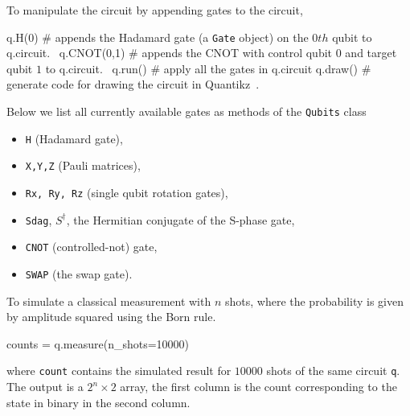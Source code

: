 To manipulate the circuit by appending gates to the circuit,
\begin{mycode}
	q.H(0) # appends the Hadamard gate (a \texttt{Gate} object) on the $ 0th $ qubit to q.circuit. \
	q.CNOT(0,1) # appends the CNOT with control qubit $ 0 $  and target qubit $ 1 $ to q.circuit. \
	q.run() # apply all the gates in q.circuit
	q.draw() # generate code for drawing the circuit in Quantikz~\cite{kay2023tutorialquantikzpackage}.
\end{mycode}
Below we list all currently available gates as methods of the \texttt{Qubits} class
\begin{itemize}
	\item \texttt{H} (Hadamard gate), 
	\item \texttt{X,Y,Z} (Pauli matrices),
	\item \texttt{Rx, Ry, Rz} (single qubit rotation gates),
	\item \texttt{Sdag}, $ S^{\dagger}$, the Hermitian conjugate of the S-phase gate,
	\item  \texttt{CNOT} (controlled-not) gate,
	\item \texttt{SWAP} (the swap gate).
\end{itemize}
To simulate a classical measurement with $ n $ shots, where the probability is given by amplitude squared using the Born rule.
\begin{mycode}
	counts = q.measure(n_shots=10000)
\end{mycode}
where \texttt{count} contains the simulated result for $ 10000 $ shots of the same circuit \texttt{q}. The output is a $ 2^n \times 2 $ array, the first column is the count corresponding to the state in binary in the second column.

